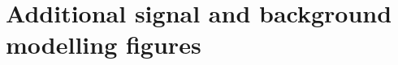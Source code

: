 \chapter{Additional signal and background modelling figures}
\label{app:modelling}

\begin{comment}
\begin{figure}[htp!]
\centering
 \subfloat[RV fits with functional form: DCB$+1$G]{\shortstack{
\texttt{[image: modellingFigures/\\whichFig/DCBpG/LI/LCtest\_ggh\_UntaggedTag\_0\_rv\_125.pdf]} 
\texttt{[image: modellingFigures/\\whichFig/DCBpG/LI/LCtest\_ggh\_UntaggedTag\_1\_rv\_125.pdf]} \\
\texttt{[image: modellingFigures/\\whichFig/DCBpG/LI/LCtest\_ggh\_UntaggedTag\_2\_rv\_125.pdf]} 
\texttt{[image: modellingFigures/\\whichFig/DCBpG/LI/LCtest\_ggh\_UntaggedTag\_3\_rv\_125.pdf]} 
}}\\
 \subfloat[RV fits with functional form: Sum of Gaussians]{\shortstack{
\texttt{[image: modellingFigures/\\whichFig/nGaus/LI/LCtest\_ggh\_UntaggedTag\_0\_rv\_125.pdf]} 
\texttt{[image: modellingFigures/\\whichFig/nGaus/LI/LCtest\_ggh\_UntaggedTag\_1\_rv\_125.pdf]} \\
\texttt{[image: modellingFigures/\\whichFig/nGaus/LI/LCtest\_ggh\_UntaggedTag\_2\_rv\_125.pdf]} 
\texttt{[image: modellingFigures/\\whichFig/nGaus/LI/LCtest\_ggh\_UntaggedTag\_3\_rv\_125.pdf]} 
}}\\
\caption{Examples of the shape of the simulated \mgg distribution (\mH=125\GeV) for the ggH process for the \Untagged categories, where the right vertex (RV) was selected. The plots show the agreement between the simulation and the parametrisation expressed as a $\chi^2$, alongside the number of non-empty bins minus the number of parameters in the functional form. Bins with zero entries are ignored in the $\chi^2$ calculation.}
\end{figure}

\clearpage


\end{comment}
